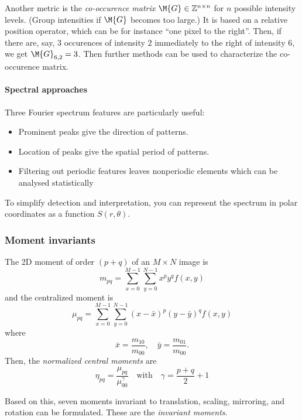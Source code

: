 Another metric is the \emph{co-occurence matrix} $\M{G} \in \mathbb{Z}^{n \times n}$ for $n$ possible intensity levels. (Group intensities if $\M{G}$ becomes too large.) It is based on a relative position operator, which can be for instance ``one pixel to the right''. Then, if there are, say, 3 occurences of intensity $2$ immediately to the right of intensity $6$, we get $\M{G}_{6,2} = 3$. Then further methods can be used to characterize the co-occurence matrix.

\paragraph{Spectral approaches}
Three Fourier spectrum features are particularly useful:
\begin{itemize}
    \item Prominent peaks give the direction of patterns.
    \item Location of peaks give the spatial period of patterns.
    \item Filtering out periodic features leaves nonperiodic elements which can be analysed statistically
\end{itemize}

To simplify detection and interpretation, you can represent the spectrum in polar coordinates as a function $S(r,\theta)$.

\subsubsection{Moment invariants}
The 2D moment of order $(p+q)$ of an $M \times N$ image is
\begin{equation}
    m_{pq} = \sum_{x=0}^{M-1} \sum_{y=0}^{N-1} x^p y^q f(x,y)
\end{equation}
and the centralized moment is
\begin{equation}
    \mu_{pq} = \sum_{x=0}^{M-1} \sum_{y=0}^{N-1} (x-\bar{x})^p (y-\bar{y})^q f(x,y)
\end{equation}
where
\begin{equation}
    \bar{x} = \frac{m_{10}}{m_{00}}, \quad \bar{y} = \frac{m_{01}}{m_{00}}.
\end{equation}
Then, the \emph{normalized central moments} are
\begin{equation}
    \eta_{pq} = \frac{\mu_{pq}}{\mu_{00}^\gamma} \quad \mbox{with} \quad \gamma = \frac{p+q}{2} + 1
\end{equation}

Based on this, seven moments invariant to translation, scaling, mirroring, and rotation can be formulated. These are the \emph{invariant moments}.

